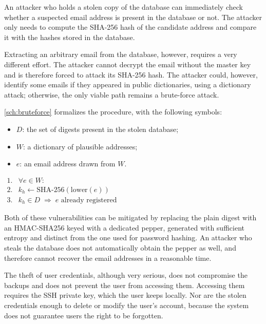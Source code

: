 An attacker who holds a stolen copy of the database can immediately check
whether a suspected email address is present in the database or not. The attacker only needs to compute the SHA-256 hash
of the candidate address and compare it with the hashes stored in the database.

Extracting an arbitrary email from the database, however, requires a very different effort.
The attacker cannot decrypt the email without the master key and is therefore forced to attack its SHA-256
hash.
The attacker could, however, identify some emails if they appeared in public dictionaries, using a
dictionary attack; otherwise, the only viable path remains a brute-force attack.

\autoref{sch:bruteforce} formalizes the procedure, with the following symbols:

\begin{itemize}
    \item $D$: the set of digests present in the stolen database;
    \item $W$: a dictionary of plausible addresses;
    \item $e$: an email address drawn from $W$.
\end{itemize}

\begin{schema}
\centering
$\begin{array}{rl}
1. & \forall e \in W: \\[4pt]
2. & k_h \leftarrow \mathrm{SHA\mbox{-}256}(\mathrm{lower}(e)) \\[4pt]
3. & k_h \in D \;\Longrightarrow\; e \mbox{ already registered}
\end{array}$
\caption{Search for registered addresses from the stolen database, by dictionary or brute force.}
\label{sch:bruteforce}
\end{schema}

Both of these vulnerabilities can be mitigated by replacing the plain digest with an HMAC-SHA256 keyed with
a dedicated pepper, generated with sufficient entropy and distinct from the one used for password hashing.
An attacker who steals the database does not automatically obtain the pepper as well, and therefore cannot
recover the email addresses in a reasonable time.

The theft of user credentials, although very serious, does not compromise the backups and does not prevent
the user from accessing them. Accessing them requires the SSH private key, which the user keeps locally.
Nor are the stolen credentials enough to delete or modify the user's account, because the system does not
guarantee users the right to be forgotten.

